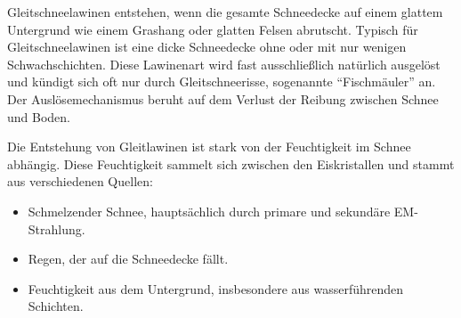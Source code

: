 


Gleitschneelawinen entstehen, wenn die gesamte Schneedecke auf einem glattem Untergrund wie einem Grashang oder glatten Felsen abrutscht. Typisch für Gleitschneelawinen ist eine dicke Schneedecke ohne oder mit nur wenigen Schwachschichten. Diese Lawinenart wird fast ausschließlich natürlich ausgelöst und kündigt sich oft nur durch Gleitschneerisse, sogenannte “Fischmäuler” an. Der Auslösemechanismus beruht auf dem Verlust der Reibung zwischen Schnee und Boden.

Die Entstehung von Gleitlawinen ist stark von der Feuchtigkeit im Schnee abhängig. Diese Feuchtigkeit sammelt sich zwischen den Eiskristallen und stammt aus verschiedenen Quellen:

\begin{itemize}
    \item Schmelzender Schnee, hauptsächlich durch primare und sekundäre EM-Strahlung.
    \item Regen, der auf die Schneedecke fällt.
    \item Feuchtigkeit aus dem Untergrund, insbesondere aus wasserführenden Schichten.
\end{itemize}
